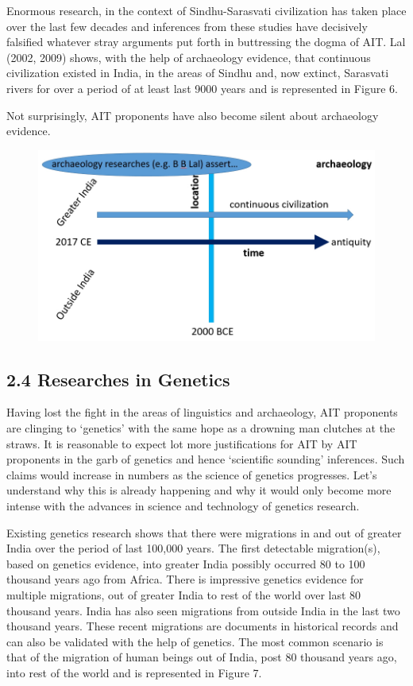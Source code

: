 Enormous research, in the context of Sindhu-Sarasvati civilization has taken place over the last few decades and inferences from these studies have decisively falsified whatever stray arguments put forth in buttressing the dogma of AIT. Lal (2002, 2009) shows, with the help of archaeology evidence, that continuous civilization existed in India, in the areas of Sindhu and, now extinct, Sarasvati rivers for over a period of at least last 9000 years and is represented in Figure 6.

Not surprisingly, AIT proponents have also become silent about archaeology evidence.

\begin{figure}[!htbp]
\includegraphics[scale=0.22]{"images/8-06.jpg"}
\caption{}\label{art8-fig06}
\end{figure}


\subsection*{2.4 Researches in Genetics}

Having lost the fight in the areas of linguistics and archaeology, AIT proponents are clinging to ‘genetics’ with the same hope as a drowning man clutches at the straws. It is reasonable to expect lot more justifications for AIT by AIT proponents in the garb of genetics and hence ‘scientific sounding’ inferences. Such claims would increase in numbers as the science of genetics progresses. Let’s understand why this is already happening and why it would only become more intense with the advances in science and technology of genetics research.

Existing genetics research shows that there were migrations in and out of greater India over the period of last 100,000 years. The first detectable migration(s), based on genetics evidence, into greater India possibly occurred 80 to 100 thousand years ago from Africa. There is impressive genetics evidence for multiple migrations, out of greater India to rest of the world over last 80 thousand years. India has also seen migrations from outside India in the last two thousand years. These recent migrations are documents in historical records and can also be validated with the help of genetics. The most common scenario is that of the migration of human beings out of India, post 80 thousand years ago, into rest of the world and is represented in Figure 7.

